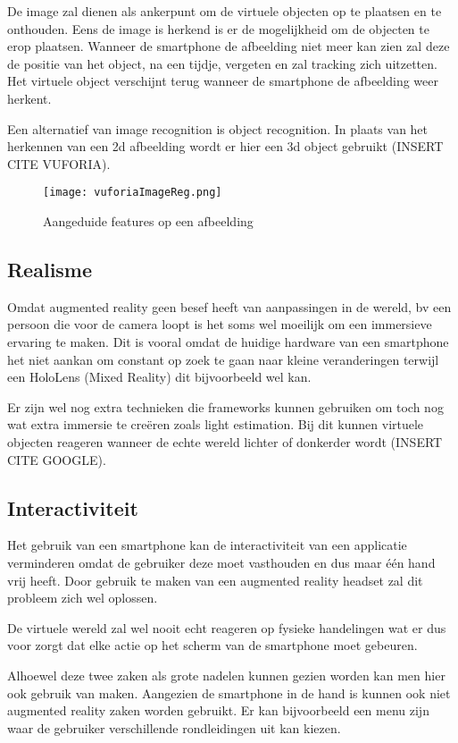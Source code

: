 De image zal dienen als ankerpunt om de virtuele objecten op te plaatsen en te onthouden. 
Eens de image is herkend is er de mogelijkheid om de objecten te erop plaatsen. Wanneer de smartphone de afbeelding niet meer kan zien zal deze de positie van het object, na een tijdje, vergeten en zal tracking zich uitzetten. Het virtuele object verschijnt terug wanneer de smartphone de afbeelding weer herkent.

Een alternatief van image recognition is object recognition. In plaats van het herkennen van een 2d afbeelding wordt er hier een 3d object gebruikt (INSERT CITE VUFORIA).

\begin{figure}
    \texttt{[image: vuforiaImageReg.png]}
    \caption{Aangeduide features op een afbeelding}
    \label{fig:imagereg}
\end{figure}

\subsection{Realisme}
Omdat augmented reality geen besef heeft van aanpassingen in de wereld, bv een persoon die voor de camera loopt is het soms wel moeilijk om een immersieve ervaring te maken. Dit is vooral omdat de huidige hardware van een smartphone het niet aankan om constant op zoek te gaan naar kleine veranderingen terwijl een HoloLens (Mixed Reality) dit bijvoorbeeld wel kan.

Er zijn wel nog extra technieken die frameworks kunnen gebruiken om toch nog wat extra immersie te creëren zoals light estimation. Bij dit kunnen virtuele objecten reageren wanneer de echte wereld lichter of donkerder wordt (INSERT CITE GOOGLE).

\subsection{Interactiviteit}
Het gebruik van een smartphone kan de interactiviteit van een applicatie verminderen omdat de gebruiker deze moet vasthouden en dus maar één hand vrij heeft. Door gebruik te maken van een augmented reality headset zal dit probleem zich wel oplossen.

De virtuele wereld zal wel nooit echt reageren op fysieke handelingen wat er dus voor zorgt dat elke actie op het scherm van de smartphone moet gebeuren.

Alhoewel deze twee zaken als grote nadelen kunnen gezien worden kan men hier ook gebruik van maken. Aangezien de smartphone in de hand is kunnen ook niet augmented reality zaken worden gebruikt. Er kan bijvoorbeeld een menu zijn waar de gebruiker verschillende rondleidingen uit kan kiezen.

